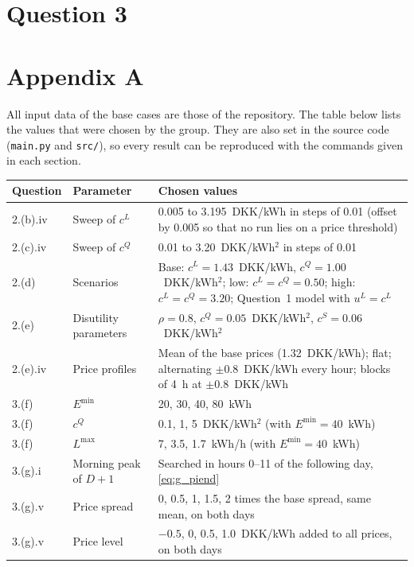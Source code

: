 \documentclass[12pt,oneside,a4paper,english]{article}
\newcommand{\Emin}{E^{\min}}
\newcommand{\uL}{u^{L}}
\newcommand{\Lmax}{L^{\max}}
\begin{document}
\newpage
\section{Question 3}


\newpage
\section{Appendix A} \label{ch6}

All input data of the base cases are those of the repository. The table below lists the values
that were chosen by the group. They are also set in the source code
(\texttt{main.py} and \texttt{src/}), so every result can be reproduced with the commands given in
each section.

\begin{table}[H]
\centering
\small
\begin{tabularx}{\textwidth}{llX}
\toprule
\textbf{Question} & \textbf{Parameter} & \textbf{Chosen values} \\
\midrule
2.(b).iv & Sweep of $c^{L}$ & 0.005 to 3.195~DKK/kWh in steps of 0.01 (offset by 0.005 so that no run lies on a price threshold) \\
2.(c).iv & Sweep of $c^{Q}$ & 0.01 to 3.20~DKK/kWh$^2$ in steps of 0.01 \\
2.(d) & Scenarios & Base: $c^{L} = 1.43$~DKK/kWh, $c^{Q} = 1.00$~DKK/kWh$^2$; low: $c^{L} = c^{Q} = 0.50$; high: $c^{L} = c^{Q} = 3.20$; Question~1 model with $\uL = c^{L}$ \\
2.(e) & Disutility parameters & $\rho = 0.8$, $c^{Q} = 0.05$~DKK/kWh$^2$, $c^{S} = 0.06$~DKK/kWh$^2$ \\
2.(e).iv & Price profiles & Mean of the base prices (1.32~DKK/kWh); flat; alternating $\pm 0.8$~DKK/kWh every hour; blocks of 4~h at $\pm 0.8$~DKK/kWh \\
\midrule
3.(f) & $\Emin$ & 20, 30, 40, 80~kWh \\
3.(f) & $c^{Q}$ & 0.1, 1, 5~DKK/kWh$^2$ (with $\Emin = 40$~kWh) \\
3.(f) & $\Lmax$ & 7, 3.5, 1.7~kWh/h (with $\Emin = 40$~kWh) \\
\midrule
3.(g).i & Morning peak of $D+1$ & Searched in hours 0--11 of the following day, \eqref{eq:g_piend} \\
3.(g).v & Price spread & 0, 0.5, 1, 1.5, 2 times the base spread, same mean, on both days \\
3.(g).v & Price level & $-0.5$, 0, 0.5, 1.0~DKK/kWh added to all prices, on both days \\

\end{tabularx}
\end{table}
\end{document}

